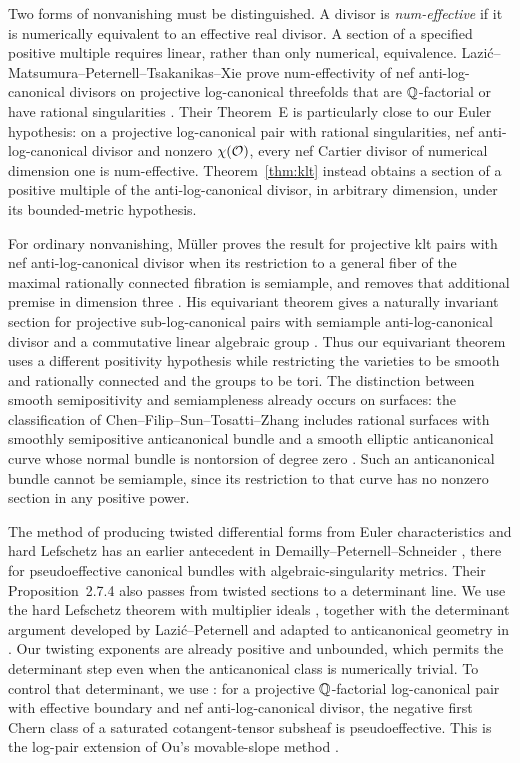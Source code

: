 Two forms of nonvanishing must be distinguished. A divisor is \emph{num-effective} if it is numerically equivalent to an effective real divisor. A section of a specified positive multiple requires linear, rather than only numerical, equivalence. Lazi\'c--Matsumura--Peternell--Tsakanikas--Xie prove num-effectivity of nef anti-log-canonical divisors on projective log-canonical threefolds that are $\mathbb Q$-factorial or have rational singularities \cite[Theorem~A]{LMPTX2023}. Their Theorem~E is particularly close to our Euler hypothesis: on a projective log-canonical pair with rational singularities, nef anti-log-canonical divisor and nonzero $\chi(\mathcal O)$, every nef Cartier divisor of numerical dimension one is num-effective. Theorem~\ref{thm:klt} instead obtains a section of a positive multiple of the anti-log-canonical divisor, in arbitrary dimension, under its bounded-metric hypothesis.

For ordinary nonvanishing, M\"uller proves the result for projective klt pairs with nef anti-log-canonical divisor when its restriction to a general fiber of the maximal rationally connected fibration is semiample, and removes that additional premise in dimension three \cite[Theorem~A and Corollary~B]{Muller2025}. His equivariant theorem gives a naturally invariant section for projective sub-log-canonical pairs with semiample anti-log-canonical divisor and a commutative linear algebraic group \cite[Theorem~C]{Muller2025}. Thus our equivariant theorem uses a different positivity hypothesis while restricting the varieties to be smooth and rationally connected and the groups to be tori. The distinction between smooth semipositivity and semiampleness already occurs on surfaces: the classification of Chen--Filip--Sun--Tosatti--Zhang includes rational surfaces with smoothly semipositive anticanonical bundle and a smooth elliptic anticanonical curve whose normal bundle is nontorsion of degree zero \cite[Theorem~1.3]{CFSTZ2026}. Such an anticanonical bundle cannot be semiample, since its restriction to that curve has no nonzero section in any positive power.

The method of producing twisted differential forms from Euler characteristics and hard Lefschetz has an earlier antecedent in Demailly--Peternell--Schneider \cite[Theorem~2.7.3]{DPS2001}, there for pseudoeffective canonical bundles with algebraic-singularity metrics. Their Proposition~2.7.4 also passes from twisted sections to a determinant line. We use the hard Lefschetz theorem with multiplier ideals \cite[Theorem~2.1.1]{DPS2001}, together with the determinant argument developed by Lazi\'c--Peternell \cite[Lemma~4.1]{LP2018} and adapted to anticanonical geometry in \cite[Lemma~5.1]{LMPTX2023}. Our twisting exponents are already positive and unbounded, which permits the determinant step even when the anticanonical class is numerically trivial. To control that determinant, we use \cite[Theorem~4.1]{LMPTX2023}: for a projective $\mathbb Q$-factorial log-canonical pair with effective boundary and nef anti-log-canonical divisor, the negative first Chern class of a saturated cotangent-tensor subsheaf is pseudoeffective. This is the log-pair extension of Ou's movable-slope method \cite{Ou2023}.


